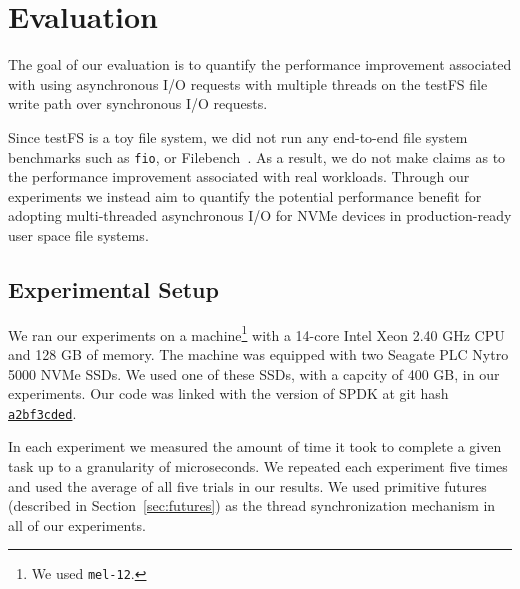 \section{Evaluation}
The goal of our evaluation is to quantify the performance improvement
associated with using asynchronous I/O requests with multiple threads on the
testFS file write path over synchronous I/O requests.

Since testFS is a toy file system, we did not run any end-to-end file system
benchmarks such as {\tt fio}, or Filebench~\cite{filebench-tarasov16}. As a
result, we do not make claims as to the performance improvement associated with
real workloads. Through our experiments we instead aim to quantify the
potential performance benefit for adopting multi-threaded asynchronous I/O for
NVMe devices in production-ready user space file systems.

\subsection{Experimental Setup}
We ran our experiments on a machine\footnote{We used {\tt mel-12}.} with a
14-core Intel Xeon 2.40 GHz CPU and 128 GB of memory. The machine was equipped
with two Seagate PLC Nytro 5000 NVMe SSDs. We used one of these SSDs, with a
capcity of 400 GB, in our experiments. Our code was linked with the version of
SPDK at git hash
\href{https://github.com/spdk/spdk/commit/a2bf3cded37b7cc7e402eae80da90891f921b56d}{\tt a2bf3cded}.

In each experiment we measured the amount of time it took to complete a given
task up to a granularity of microseconds. We repeated each experiment five
times and used the average of all five trials in our results. We used primitive
futures (described in Section~\ref{sec:futures}) as the thread synchronization
mechanism in all of our experiments.
